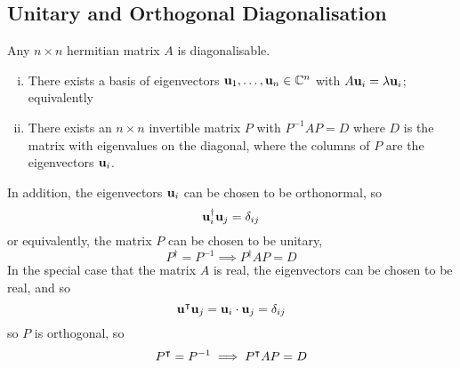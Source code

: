 \subsection{Unitary and Orthogonal Diagonalisation}
\begin{theorem}
	Any $n\times n$ hermitian matrix $A$ is diagonalisable.
	\begin{enumerate}[(i)]
		\item There exists a basis of eigenvectors $\vb u_1, \dots, \vb u_n \in \mathbb C^n$ with $A\vb u_i = \lambda \vb u_i$; equivalently
		\item There exists an $n \times n$ invertible matrix $P$ with $P^{-1}AP = D$ where $D$ is the matrix with eigenvalues on the diagonal, where the columns of $P$ are the eigenvectors $\vb u_i$.
	\end{enumerate}
	In addition, the eigenvectors $\vb u_i$ can be chosen to be orthonormal, so
	\[ \vb u^\dagger_i \vb u_j = \delta_{ij} \]
	or equivalently, the matrix $P$ can be chosen to be unitary,
	\[ P^\dagger = P^{-1} \implies P^\dagger AP = D \]
	In the special case that the matrix $A$ is real, the eigenvectors can be chosen to be real, and so
	\[ \vb u^\intercal \vb u_j = \vb u_i \cdot \vb u_j = \delta_{ij} \]
	so $P$ is orthogonal, so
	\[ P^\intercal = P^{-1} \implies P^\intercal AP = D \]
\end{theorem}
